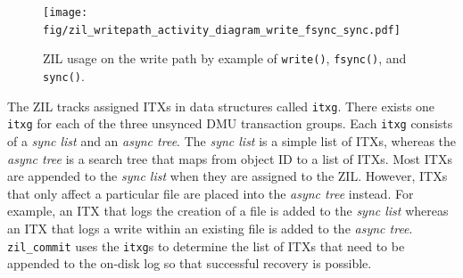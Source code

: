 \documentclass[12pt,a4paper,twoside]{book}
\begin{document}
\begin{figure}[H]
    \centering
    \texttt{[image: fig/zil\_writepath\_activity\_diagram\_write\_fsync\_sync.pdf]}
    \caption{
        ZIL usage on the write path by example of \lstinline{write()}, \lstinline{fsync()}, and \lstinline{sync()}.
    }
    \label{fig:zil_api_syscall_activity_diagrams}
\end{figure}

The ZIL tracks assigned ITXs in data structures called \lstinline{itxg}.
There exists one \lstinline{itxg} for each of the three unsynced DMU transaction groups.
Each \lstinline{itxg} consists of a \textit{sync list} and an \textit{async tree}.
The \textit{sync list} is a simple list of ITXs, whereas the \textit{async tree} is a search tree that maps from object ID to a list of ITXs.
Most ITXs are appended to the \textit{sync list} when they are assigned to the ZIL.
However, ITXs that only affect a particular file are placed into the \textit{async tree} instead.
For example, an ITX that logs the creation of a file is added to the \textit{sync list} whereas an ITX that logs a write within an existing file is added to the \textit{async tree}.
\lstinline{zil_commit} uses the \lstinline{itxg}s to determine the list of ITXs that need to be appended to the on-disk log so that successful recovery is possible.
\end{document}
